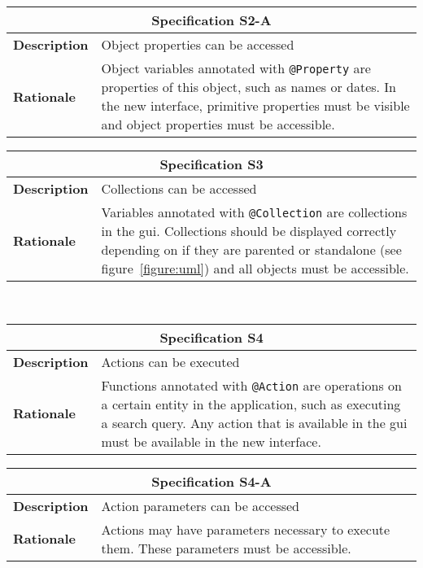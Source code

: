 \begin{tabularx}{0.49\textwidth}[t]{lX}
	\toprule
	\multicolumn{2}{c}{\textbf{Specification S2-A}} \\
	\midrule
	\textbf{Description} & Object properties can be accessed \\
	\addlinespace[0.5em]
	\textbf{Rationale}	 & Object variables annotated with \texttt{@Property} are properties of this object, such as names or dates. In the new interface, primitive properties must be visible and object properties must be accessible.\\
	\bottomrule
\end{tabularx}\hspace{0.02\textwidth}
\begin{tabularx}{0.49\textwidth}[t]{lX}
	\toprule
	\multicolumn{2}{c}{\textbf{Specification S3}} \\
	\midrule
	\textbf{Description} & Collections can be accessed \newline \\
	\addlinespace[0.5em]
	\textbf{Rationale}	 & Variables annotated with \texttt{@Collection} are collections in the \acrshort{gui}. Collections should be displayed correctly depending on if they are parented or standalone (see figure~\ref{figure:uml}) and all objects must be accessible. \\
	\bottomrule
\end{tabularx}
\\[1em]

\begin{tabularx}{0.49\textwidth}[t]{lX}
	\toprule
	\multicolumn{2}{c}{\textbf{Specification S4}} \\
	\midrule
	\textbf{Description} & Actions can be executed \newline \\
	\addlinespace[0.5em]
	\textbf{Rationale}	 & Functions annotated with \texttt{@Action} are operations on a certain entity in the application, such as executing a search query. Any action that is available in the \acrshort{gui} must be available in the new interface. \\
	\bottomrule
\end{tabularx}\hspace{0.02\textwidth}
\begin{tabularx}{0.49\textwidth}[t]{lX}
	\toprule
	\multicolumn{2}{c}{\textbf{Specification S4-A}} \\
	\midrule
	\textbf{Description} & Action parameters can be accessed \\
	\addlinespace[0.5em]
	\textbf{Rationale}	 & Actions may have parameters necessary to execute them. These parameters must be accessible. \newline \newline \newline \\
	\bottomrule
\end{tabularx}
\\[1em]

